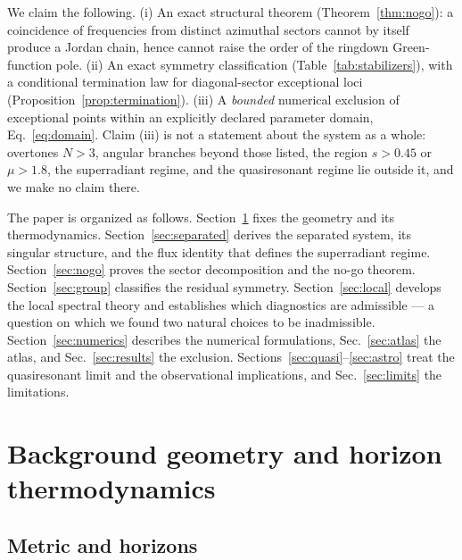 \documentclass[aps,prd,reprint,superscriptaddress,nofootinbib,longbibliography]{revtex4-2}
\theoremstyle{plain}
\theoremstyle{definition}
\theoremstyle{remark}
\begin{document}
We claim the following. (i) An exact structural theorem
(Theorem~\ref{thm:nogo}): a coincidence of frequencies from distinct azimuthal
sectors cannot by itself produce a Jordan chain, hence cannot raise the order of
the ringdown Green-function pole. (ii) An exact symmetry classification
(Table~\ref{tab:stabilizers}), with a conditional termination law for
diagonal-sector exceptional loci (Proposition~\ref{prop:termination}). (iii) A
\emph{bounded} numerical exclusion of exceptional points within an explicitly
declared parameter domain, Eq.~\eqref{eq:domain}. Claim (iii) is not a statement
about the system as a whole: overtones $N>3$, angular branches beyond those
listed, the region $s>0.45$ or $\mu>1.8$, the superradiant regime, and the
quasiresonant regime lie outside it, and we make no claim there.

The paper is organized as follows. Section~\ref{sec:background} fixes the
geometry and its thermodynamics. Section~\ref{sec:separated} derives the
separated system, its singular structure, and the flux identity that defines the
superradiant regime. Section~\ref{sec:nogo} proves the sector decomposition and
the no-go theorem. Section~\ref{sec:group} classifies the residual symmetry.
Section~\ref{sec:local} develops the local spectral theory and establishes which
diagnostics are admissible --- a question on which we found two natural choices
to be inadmissible. Section~\ref{sec:numerics} describes the numerical
formulations, Sec.~\ref{sec:atlas} the atlas, and Sec.~\ref{sec:results} the
exclusion. Sections~\ref{sec:quasi}--\ref{sec:astro} treat the quasiresonant
limit and the observational implications, and Sec.~\ref{sec:limits} the
limitations.

\section{Background geometry and horizon thermodynamics}\label{sec:background}

\subsection{Metric and horizons}\label{sec:bg:metric}
\end{document}
